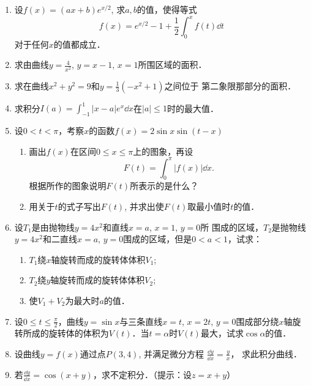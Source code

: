 \begin{enumerate}
\item 设$f(x)=(ax+b)e^{x/2}$, 求$a,b$的值，使得等式
\[f (x) =e^{x/2}-1+\frac{1}{2}\int^x_0 f (t) \dd t\]
对于任何$x$的值都成立．
\item 求由曲线$y=\frac{4}{x^2}$, $y=x-1$, $x=1$所围区域的面积．
\item 求在曲线$x^2+y^2=9$和$y=\frac{1}{3}(-x^2+1)$之间位于
第二象限那部分的面积．
\item 求积分$I(a)=\displaystyle\int^1_{-1}|x-a|e^x\dd x$在$|a|\le 1$时的最大值．
\item 设$0<t<\pi$，考察$x$的函数$f(x)=2\sin x\sin(t-x)$
\begin{enumerate}
    \item 画出$f(x)$在区间$0\le x\le \pi$上的图象，再设
    \[F (t) =\int^\pi_0 |f (x)|\dd x.\]
根据所作的图象说明$F(t)$所表示的是什么？
\item 用关于$t$的式子写出$F(t)$, 并求出使$F(t)$取最小值时$t$的值．
\end{enumerate}
\item  设$T_1$是由抛物线$y=4x^2$和直线$x=a$, $x=1$, $y=0$所
围成的区域，$T_2$是抛物线$y=4x^2$和二直线$x=a$, $y=0$围成的区域，但是$0<a<1$，试求：
\begin{enumerate}
\item $T_1$绕$x$轴旋转而成的旋转体体积$V_1$;    \item $T_2$绕$y$轴旋转而成的旋转体体积$V_2$;    \item 使$V_1+V_2$为最大时$a$的值．
\end{enumerate}
\item 设$0\le t\le \frac{\pi}{2}$，曲线$y=\sin x$与三条直线$x=t$, $x=2t$, 
$y=0$围成部分绕$x$轴旋转所成的旋转体的体积为$V(t)$．当$t=\alpha$时$V(t)$最大，试求$\cos\alpha$的值．
\item 设曲线$y=f(x)$通过点$P(3, 4)$, 并满足微分方程
$\frac{\dd y}{\dd x}=\frac{y}{x}$，
求此积分曲线．

\item 若$\frac{\dd y}{\dd x}=\cos(x+y)$，求不定积分．（提示：设$z=x+y$）
\end{enumerate}
